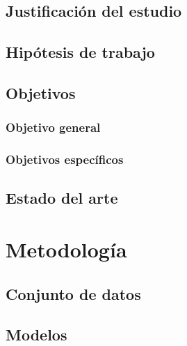 \documentclass[a4paper, 12pt, print, index, oneside, times, custombib]{PhDThesisPSnPDF}
\begin{document}
\section{Justificación del estudio}
\label{sec:Justificación}


\section{Hipótesis de trabajo}
\label{sec:Hipótesis}

\section{Objetivos}
\subsection{Objetivo general}
\label{sec:Objetivo}



\subsection{Objetivos específicos}
\label{sec:Objetivos}


\section{Estado del arte}
\label{sec:SOTA}


\chapter{Metodología}
\label{sec:Metodología}

\section{Conjunto de datos}
\label{sec:Datos}

\section{Modelos}
\label{sec:Modelos}
\end{document}
